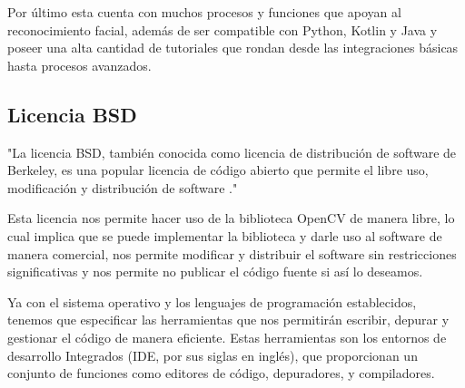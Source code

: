 Por último esta cuenta con muchos procesos y funciones que apoyan al reconocimiento facial, además de ser compatible con Python, Kotlin y Java y poseer una alta cantidad de tutoriales que rondan desde las integraciones básicas hasta procesos avanzados.

\subsection{Licencia BSD}

\begin{list}{}%
    {\setlength{\leftmargin}{1cm}\setlength{\rightmargin}{1cm}}
    \item\relax
    \small

"La licencia BSD, también conocida como licencia de distribución de software de Berkeley, es una popular licencia de código abierto que permite el libre uso, modificación y distribución de software \cite{CitaD17}."

\end{list}

Esta licencia nos permite hacer uso de la biblioteca OpenCV de manera libre, lo cual implica que se puede implementar la biblioteca y darle uso al software de manera comercial, nos permite modificar y distribuir el software sin restricciones significativas y nos permite no publicar el código fuente si así lo deseamos.

Ya con el sistema operativo y los lenguajes de programación establecidos, tenemos que especificar las herramientas que nos permitirán escribir, depurar y gestionar el código de manera eficiente. Estas herramientas son los entornos de desarrollo Integrados (IDE, por sus siglas en inglés), que proporcionan un conjunto de funciones como editores de código, depuradores, y compiladores.

